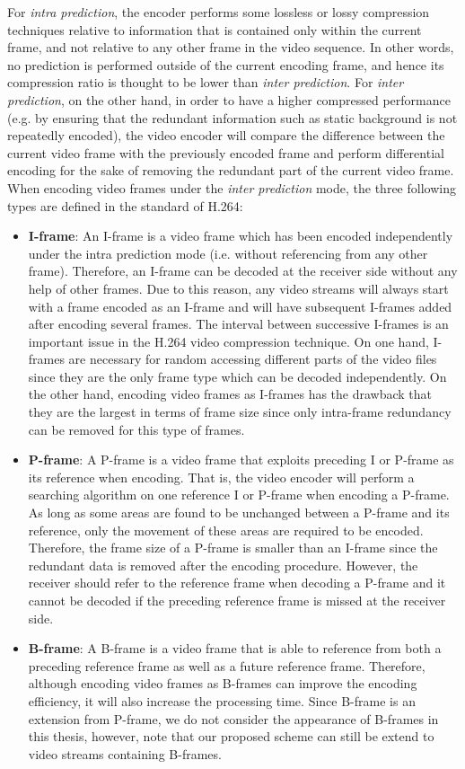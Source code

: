 For \emph{intra prediction}, the encoder performs some lossless or lossy compression techniques relative to information that is contained only within the current frame, and not relative to any other frame in the video sequence.
In other words, no prediction is performed outside of the current encoding frame, and hence its compression ratio is thought to be lower than \emph{inter prediction}.
For \emph{inter prediction}, on the other hand, in order to have a higher compressed performance (e.g. by ensuring that the redundant information such as static background is not repeatedly encoded), the video encoder will compare the difference between the current video frame with the previously encoded frame and perform differential encoding for the sake of removing the redundant part of the current video frame.
When encoding video frames under the \emph{inter prediction} mode, the three following types are defined in the standard of H.264:
\begin{itemize}
\item \textbf{I-frame}:
An I-frame is a video frame which has been encoded independently under the intra prediction mode (i.e. without referencing from any other frame).
Therefore, an I-frame can be decoded at the receiver side without any help of other frames.
Due to this reason, any video streams will always start with a frame encoded as an I-frame and will have subsequent I-frames added after encoding several frames.
The interval between successive I-frames is an important issue in the H.264 video compression technique.
On one hand, I-frames are necessary for random accessing different parts of the video files since they are the only frame type which can be decoded independently.
On the other hand, encoding video frames as I-frames has the drawback that they are the largest in terms of frame size since only intra-frame redundancy can be removed for this type of frames.
\item \textbf{P-frame}:
A P-frame is a video frame that exploits preceding I or P-frame as its reference when encoding.
That is, the video encoder will perform a searching algorithm on one reference I or P-frame when encoding a P-frame.
As long as some areas are found to be unchanged between a P-frame and its reference, only the movement of these areas are required to be encoded.
Therefore, the frame size of a P-frame is smaller than an I-frame since the redundant data is removed after the encoding procedure.
However, the receiver should refer to the reference frame when decoding a P-frame and it cannot be decoded if the preceding reference frame is missed at the receiver side.
\item \textbf{B-frame}:
A B-frame is a video frame that is able to reference from both a preceding reference frame as well as a future reference frame.
Therefore, although encoding video frames as B-frames can improve the encoding efficiency, it will also increase the processing time.
Since B-frame is an extension from P-frame, we do not consider the appearance of B-frames in this thesis, however, note that our proposed scheme can still be extend to video streams containing  B-frames.
\end{itemize}

